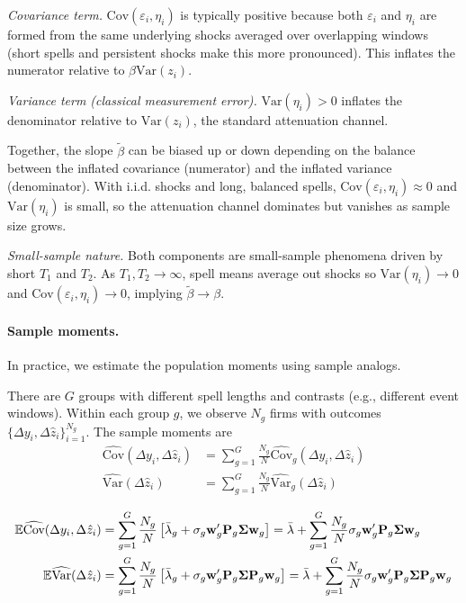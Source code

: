 \documentclass[11pt,a4paper]{article}
\newcommand{\Var}{\text{Var}}
\newcommand{\Cov}{\text{Cov}}
\begin{document}

 
\textit{Covariance term.} $\Cov(\varepsilon_i,\eta_i)$ is typically positive because both $\varepsilon_i$ and $\eta_i$ are formed from the same underlying shocks averaged over overlapping windows (short spells and persistent shocks make this more pronounced). This inflates the numerator relative to $\beta\Var(z_i)$.

\textit{Variance term (classical measurement error).} $\Var(\eta_i)>0$ inflates the denominator relative to $\Var(z_i)$, the standard attenuation channel.

Together, the slope $\tilde\beta$ can be biased up or down depending on the balance between the inflated covariance (numerator) and the inflated variance (denominator). With i.i.d. shocks and long, balanced spells, $\Cov(\varepsilon_i,\eta_i)\approx 0$ and $\Var(\eta_i)$ is small, so the attenuation channel dominates but vanishes as sample size grows.

\textit{Small-sample nature.} Both components are small-sample phenomena driven by short $T_1$ and $T_2$. As $T_1,T_2\to\infty$, spell means average out shocks so $\Var(\eta_i)\to 0$ and $\Cov(\varepsilon_i,\eta_i)\to 0$, implying $\tilde\beta\to\beta$.


\paragraph{Sample moments.} In practice, we estimate the population moments using sample analogs. 

There are $G$ groups with different spell lengths and contrasts (e.g., different event windows). Within each group $g$, we observe $N_g$ firms with outcomes $\{\Delta y_i, \Delta \hat z_i\}_{i=1}^{N_g}$. The sample moments are
\begin{align}
\widehat{\Cov}(\Delta y_i,\Delta \hat z_i) &= \sum_{g=1}^G \frac{N_g}{N} \widehat{\Cov}_g(\Delta y_i,\Delta \hat z_i)\\
\widehat{\Var}(\Delta \hat z_i) &= \sum_{g=1}^G \frac{N_g}{N} \widehat{\Var}_g(\Delta \hat z_i)
\end{align}

\begin{align}
\mathbb E\widehat{\Cov}(\Delta y_i,\Delta \hat z_i) &= \sum_{g=1}^G \frac{N_g}{N} \left[ 
\Bar\lambda_g
+ \sigma_g \mathbf w_g' \mathbf P_g\mathbf\Sigma \mathbf w_g\right] = 
\Bar\lambda +\sum_{g=1}^G \frac{N_g}{N} \sigma_g \mathbf w_g' \mathbf P_g\mathbf\Sigma \mathbf w_g\\
\mathbb E\widehat{\Var}(\Delta \hat z_i) &= \sum_{g=1}^G \frac{N_g}{N} \left[ 
\Bar\lambda_g
+ \sigma_g \mathbf w_g' \mathbf P_g\mathbf\Sigma \mathbf P_g \mathbf w_g\right] = 
\Bar\lambda +\sum_{g=1}^G \frac{N_g}{N} \sigma_g \mathbf w_g' \mathbf P_g\mathbf\Sigma \mathbf P_g \mathbf w_g
\end{align}
\end{document}
